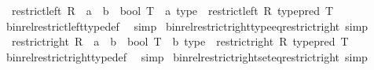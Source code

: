 \begin{isabellebody}
\ \ {\isachardoublequoteopen}restrict{\isacharunderscore}{\kern0pt}left\ {\isacharparenleft}{\kern0pt}R\ {\isacharcolon}{\kern0pt}{\isacharcolon}{\kern0pt}\ {\isacharprime}{\kern0pt}a\ {\isasymRightarrow}\ {\isacharprime}{\kern0pt}b\ {\isasymRightarrow}\ bool{\isacharparenright}{\kern0pt}\ {\isacharparenleft}{\kern0pt}T\ {\isacharcolon}{\kern0pt}{\isacharcolon}{\kern0pt}\ {\isacharprime}{\kern0pt}a\ type{\isacharparenright}{\kern0pt}\ {\isacharequal}{\kern0pt}\ restrict{\isacharunderscore}{\kern0pt}left\ R\ {\isacharparenleft}{\kern0pt}type{\isacharunderscore}{\kern0pt}pred\ T{\isacharparenright}{\kern0pt}{\isachardoublequoteclose}\isanewline
%
\isadelimproof
\ \ %
\endisadelimproof
%
\isatagproof
{}\isamarkupfalse%
\ bin{\isacharunderscore}{\kern0pt}rel{\isacharunderscore}{\kern0pt}restrict{\isacharunderscore}{\kern0pt}left{\isacharunderscore}{\kern0pt}type{\isacharunderscore}{\kern0pt}def\ \isamarkupfalse%
\ simp%
\endisatagproof
{\isafoldproof}%
%
\isadelimproof
\isanewline
%
\endisadelimproof
\isanewline
{}\isamarkupfalse%
\ bin{\isacharunderscore}{\kern0pt}rel{\isacharunderscore}{\kern0pt}restrict{\isacharunderscore}{\kern0pt}right{\isacharunderscore}{\kern0pt}type{\isacharunderscore}{\kern0pt}eq{\isacharunderscore}{\kern0pt}restrict{\isacharunderscore}{\kern0pt}right\ {\isacharbrackleft}{\kern0pt}simp{\isacharbrackright}{\kern0pt}{\isacharcolon}{\kern0pt}\isanewline
\ \ {\isachardoublequoteopen}restrict{\isacharunderscore}{\kern0pt}right\ {\isacharparenleft}{\kern0pt}R\ {\isacharcolon}{\kern0pt}{\isacharcolon}{\kern0pt}\ {\isacharprime}{\kern0pt}a\ {\isasymRightarrow}\ {\isacharprime}{\kern0pt}b\ {\isasymRightarrow}\ bool{\isacharparenright}{\kern0pt}\ {\isacharparenleft}{\kern0pt}T\ {\isacharcolon}{\kern0pt}{\isacharcolon}{\kern0pt}\ {\isacharprime}{\kern0pt}b\ type{\isacharparenright}{\kern0pt}\ {\isacharequal}{\kern0pt}\ restrict{\isacharunderscore}{\kern0pt}right\ R\ {\isacharparenleft}{\kern0pt}type{\isacharunderscore}{\kern0pt}pred\ T{\isacharparenright}{\kern0pt}{\isachardoublequoteclose}\isanewline
%
\isadelimproof
\ \ %
\endisadelimproof
%
\isatagproof
{}\isamarkupfalse%
\ bin{\isacharunderscore}{\kern0pt}rel{\isacharunderscore}{\kern0pt}restrict{\isacharunderscore}{\kern0pt}right{\isacharunderscore}{\kern0pt}type{\isacharunderscore}{\kern0pt}def\ \isamarkupfalse%
\ simp%
\endisatagproof
{\isafoldproof}%
%
\isadelimproof
\isanewline
%
\endisadelimproof
\isanewline
{}\isamarkupfalse%
\ bin{\isacharunderscore}{\kern0pt}rel{\isacharunderscore}{\kern0pt}restrict{\isacharunderscore}{\kern0pt}right{\isacharunderscore}{\kern0pt}set{\isacharunderscore}{\kern0pt}eq{\isacharunderscore}{\kern0pt}restrict{\isacharunderscore}{\kern0pt}right\ {\isacharbrackleft}{\kern0pt}simp{\isacharbrackright}{\kern0pt}{\isacharcolon}{\kern0pt}\isanewline

\end{isabellebody}
